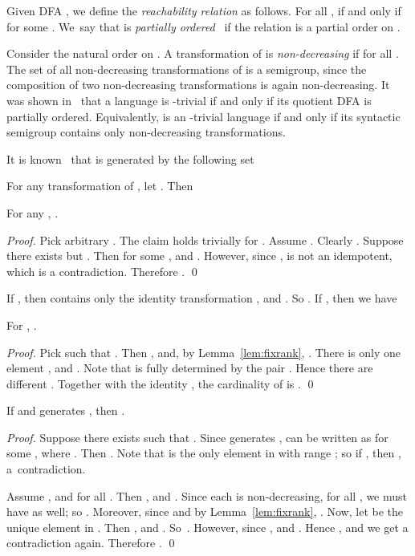 \documentclass{llncs}
\begin{document}
Given DFA , we  define the \emph{reachability relation}  as follows. For all ,  if and only if  for some . We~say that  is \emph{partially ordered}~\cite{BrFi80} if the relation  is a partial order on . 

Consider the natural order  on . A transformation  of  is \emph{non-decreasing} if  for all . The set  of all non-decreasing transformations of  is a semigroup, since the composition of two non-decreasing transformations is again non-decreasing. It was shown in~\cite{BrFi80} that a language  is -trivial if and only if its quotient DFA is partially ordered. Equivalently,  is an -trivial language if and only if its syntactic semigroup contains only non-decreasing transformations. 


 It is known~\cite{GaMa09} that   is generated by the following set 

For any transformation  of , let . Then 


\begin{lemma}\label{lem:fixrank} 
For any , . 
\end{lemma}

\begin{proof} 
Pick arbitrary . The claim holds trivially for . Assume . Clearly . Suppose there exists  but . Then  for some , and . However, since ,  is not an idempotent, which is a contradiction. Therefore . \qed
\end{proof}

If , then  contains only the identity transformation , and . So . If , then we have

\begin{lemma}\label{lem:carGF}
For , . 
\end{lemma}

\begin{proof} 
Pick  such that . Then , and, by Lemma~\ref{lem:fixrank}, . There is only one element , and . Note that  is fully determined by the pair . Hence there are  different . Together with the identity , the cardinality of  is . \qed
\end{proof}

\begin{lemma}\label{lem:minGF} 
If  and  generates , then . 
\end{lemma}

\begin{proof}
Suppose there exists  such that . Since  generates ,  can be written as  for some , where . Then . Note that  is the only element in  with range ; so if , then , a~contradiction. 

Assume , and  for all . Then , and . Since each  is non-decreasing, for all , we must have  as well; so . Moreover, since  and  by Lemma~\ref{lem:fixrank}, . Now, let  be the unique element in . Then , and . So~. However, since ,  and . Hence , and we get a contradiction again. Therefore . \qed
\end{proof}
\end{document}
